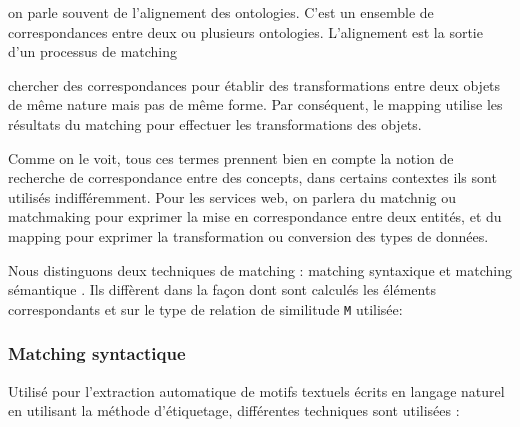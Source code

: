   \begin{mydef}[Alignement]
    on parle souvent de l'alignement des ontologies. C'est un ensemble
    de correspondances entre deux ou plusieurs
    ontologies. L'alignement est la sortie d’un processus de matching
  \end{mydef}

  \begin{mydef}[Mapping]
    chercher des correspondances pour établir des transformations
    entre deux objets de même nature mais pas de même forme. Par
    conséquent, le mapping utilise les résultats du matching pour
    effectuer les transformations des objets.
  \end{mydef}

  Comme on le voit, tous ces termes prennent bien en compte la notion
  de recherche de correspondance entre des concepts, dans certains
  contextes ils sont utilisés indifféremment.  Pour les services web,
  on parlera du matchnig ou matchmaking pour exprimer la mise en
  correspondance entre deux entités, et du mapping pour exprimer la
  transformation ou conversion des types de données.

  Nous distinguons deux techniques de matching : matching syntaxique
  et matching sémantique . Ils diffèrent dans la façon dont sont
  calculés les éléments correspondants et sur le type de relation de
  similitude \verb|M| utilisée:

    \subsubsection{Matching syntactique}
    \label{sec:matching-syntactique}
    Utilisé pour l’extraction automatique de motifs textuels écrits en
    langage naturel en utilisant la méthode d’étiquetage, différentes
    techniques sont utilisées :


